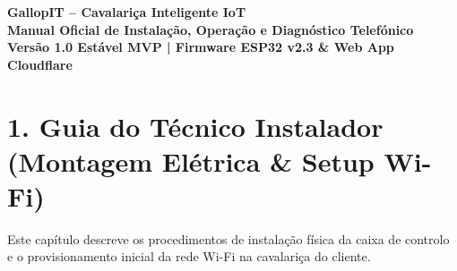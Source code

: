 \documentclass[11pt,a4paper]{article}
\begin{document}
\begin{center}
    {\Huge \textbf{\textcolor{gallopblue}{GallopIT -- Cavalariça Inteligente IoT}}}\\[0.3cm]
    {\Large \textbf{Manual Oficial de Instalação, Operação e Diagnóstico Telefónico}}\\[0.2cm]
    {\small \textbf{Versão 1.0 Estável MVP | Firmware ESP32 v2.3 \& Web App Cloudflare}}\\
    \hrulefill
\end{center}

\vspace{0.3cm}

\section*{\textcolor{gallopblue}{1. Guia do Técnico Instalador (Montagem Elétrica \& Setup Wi-Fi)}}

Este capítulo descreve os procedimentos de instalação física da caixa de controlo e o provisionamento inicial da rede Wi-Fi na cavalariça do cliente.
\end{document}
